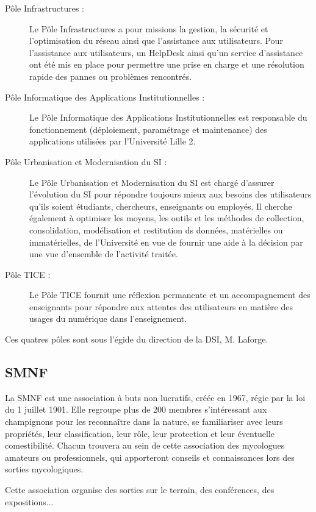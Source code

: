 \documentclass[11pt, a4paper, twoside]{report}
\begin{document}
\begin{description}
\item[Pôle Infrastructures :] Le Pôle Infrastructures a pour missions la gestion, la sécurité et l'optimisation du réseau ainsi que l'assistance aux utilisateurs. Pour l'assistance aux utilisateurs, un HelpDesk ainsi qu'un service d'assistance ont été mis en place pour permettre une prise en charge et une résolution rapide des pannes ou problèmes rencontrés. 
\item[Pôle Informatique des Applications Institutionnelles :] Le Pôle Informatique des Applications Institutionnelles est responsable du fonctionnement (déploiement, paramétrage et maintenance) des applications utilisées par l'Université Lille 2. 
\item[Pôle Urbanisation et Modernisation du SI :] Le Pôle Urbanisation et Modernisation du SI est chargé d'assurer l'évolution du SI pour répondre toujours mieux aux besoins des utilisateurs qu'ils soient étudiants, chercheurs, enseignants ou employés. Il cherche également à optimiser les moyens, les outils et les méthodes de collection, consolidation, modélisation et restitution ds données, matérielles ou immatérielles, de l'Université en vue de fournir une aide à la décision par une vue d'ensemble de l'activité traitée.
\item[Pôle TICE :] Le Pôle TICE fournit une réflexion permanente et un accompagnement des enseignants pour répondre aux attentes des utilisateurs en matière des usages du numérique dans l'enseignement.
\end{description}

Ces quatres pôles sont sous l'égide du direction de la DSI, M. Laforge.


\subsection{SMNF}
La SMNF est une association à buts non lucratifs, créée en 1967, régie par la loi du 1 juillet 1901. Elle regroupe plus de 200 membres s'intéressant aux champignons pour les reconnaître dans la nature, se familiariser avec leurs propriétés, leur classification, leur rôle, leur protection et leur éventuelle comestibilité. Chacun trouvera au sein de cette association des mycologues amateurs ou professionnels, qui apporteront conseils et connaissances lors des sorties mycologiques.

Cette association organise des sorties sur le terrain, des conférences, des expositions...
\end{document}
